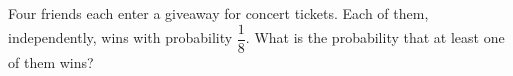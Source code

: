 Four friends each enter a giveaway for concert tickets. Each of them, independently, wins with probability $\dfrac{1}{8}$. What is the probability that at least one of them wins?
